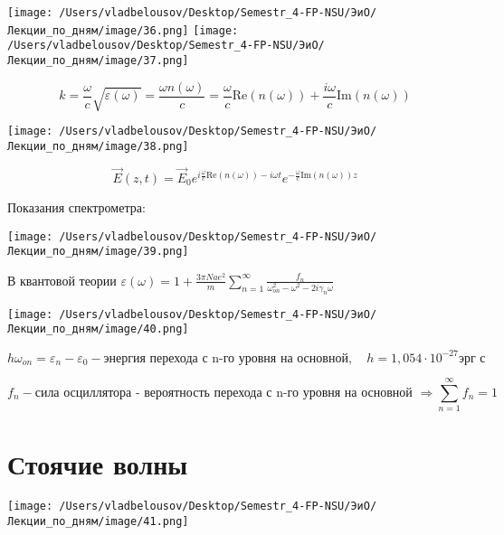 \documentclass[12pt, a4paper]{report}
\begin{document}
\begin{center}
    \texttt{[image: /Users/vladbelousov/Desktop/Semestr\_4-FP-NSU/ЭиО/Лекции\_по\_дням/image/36.png]}
    \texttt{[image: /Users/vladbelousov/Desktop/Semestr\_4-FP-NSU/ЭиО/Лекции\_по\_дням/image/37.png]}
\end{center}

\[ k = \frac{\omega}{c }  \sqrt{ \varepsilon ( \omega )} = \frac{ \omega n ( \omega )}{c }  = \frac{\omega}{ c } \mathrm{Re } (n (\omega))+ \frac{i \omega}{c } \mathrm{Im }  (n (\omega))    \] 

\begin{center}
    \texttt{[image: /Users/vladbelousov/Desktop/Semestr\_4-FP-NSU/ЭиО/Лекции\_по\_дням/image/38.png]}
\end{center}

\[ \vec{E } (z, t ) = \vec{E } _ 0 e ^{ i \frac{\omega}{c } \mathrm{Re } (n ( \omega )) - i \omega t  } e^{- \frac{\omega}{ c } \mathrm{Im } (n ( \omega )) z  } \] 

Показания спектрометра: 

\begin{center}
    \texttt{[image: /Users/vladbelousov/Desktop/Semestr\_4-FP-NSU/ЭиО/Лекции\_по\_дням/image/39.png]}
\end{center}

В квантовой теории \(\displaystyle  \varepsilon ( \omega ) = 1 + \frac{3 \pi Na e ^2 }{m } \sum_{n=1}^{\infty  } \frac{f_n }{\omega_{on } ^2 - \omega ^2 -2 i \gamma_n \omega }    \) 

\begin{center}
    \texttt{[image: /Users/vladbelousov/Desktop/Semestr\_4-FP-NSU/ЭиО/Лекции\_по\_дням/image/40.png]}
\end{center}

\[ h \omega _{on     } = \varepsilon_n -\varepsilon_0 - \text{энергия перехода с n-го уровня на основной} ,\quad  h = 1,054 \cdot 10 ^{-27} \text{эрг с }    \]  

\[ f_n - \text{сила осциллятора - вероятность перехода с n-го уровня на основной  } \Rightarrow \sum_{n =1} ^{\infty  } f_n = 1   \] 

\section{ Стоячие волны}

\begin{center}
    \texttt{[image: /Users/vladbelousov/Desktop/Semestr\_4-FP-NSU/ЭиО/Лекции\_по\_дням/image/41.png]}
\end{center}
\end{document}
